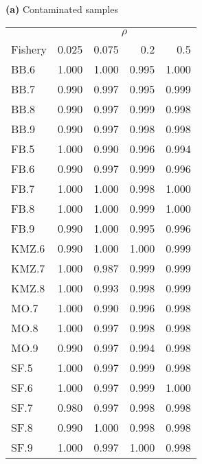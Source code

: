 {\bf (a)} Contaminated samples 
\begin{center}
\begin{tabular}{lrrrr} 
  &  \multicolumn{4}{c}{\underline{$\rho$}} \\
Fishery       &  0.025         &  0.075         &  0.2           &  0.5           \\  
\hline BB.6  &  1.000         &  1.000         &  0.995         &  1.000         \\  
BB.7          &  0.990         &  0.997         &  0.995         &  0.999         \\  
BB.8          &  0.990         &  0.997         &  0.999         &  0.998         \\  
BB.9          &  0.990         &  0.997         &  0.998         &  0.998         \\  
FB.5          &  1.000         &  0.990         &  0.996         &  0.994         \\  
FB.6          &  0.990         &  0.997         &  0.999         &  0.996         \\  
FB.7          &  1.000         &  1.000         &  0.998         &  1.000         \\  
FB.8          &  1.000         &  1.000         &  0.999         &  1.000         \\  
FB.9          &  0.990         &  1.000         &  0.995         &  0.996         \\  
KMZ.6         &  0.990         &  1.000         &  1.000         &  0.999         \\  
KMZ.7         &  1.000         &  0.987         &  0.999         &  0.999         \\  
KMZ.8         &  1.000         &  0.993         &  0.998         &  0.999         \\  
MO.7          &  1.000         &  0.990         &  0.996         &  0.998         \\  
MO.8          &  1.000         &  0.997         &  0.998         &  0.998         \\  
MO.9          &  0.990         &  0.997         &  0.994         &  0.998         \\  
SF.5          &  1.000         &  0.997         &  0.999         &  0.998         \\  
SF.6          &  1.000         &  0.997         &  0.999         &  1.000         \\  
SF.7          &  0.980         &  0.997         &  0.998         &  0.998         \\  
SF.8          &  0.990         &  1.000         &  0.998         &  0.998         \\  
SF.9          &  1.000         &  0.997         &  1.000         &  0.998         \\  
\end{tabular} 
\end{center}
